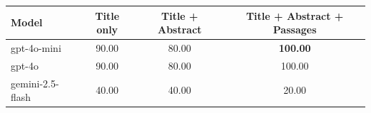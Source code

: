 \begin{tabular}{lccc}
\toprule
Model & Title only & Title + Abstract & Title + Abstract + Passages \\
\midrule
gpt-4o-mini & 90.00 & 80.00 & \textbf{100.00} \\
gpt-4o & 90.00 & 80.00 & 100.00 \\
gemini-2.5-flash & 40.00 & 40.00 & 20.00 \\
\bottomrule
\end{tabular}
